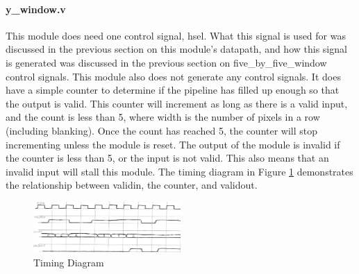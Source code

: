 \paragraph{y\_window.v}
This module does need one control signal, hsel. What this signal is used for was 
discussed in the previous section on this module's datapath, and how this 
signal is generated was discussed in the previous section on five\_by\_five\_window 
control signals. This module also does not generate any control signals. It does 
have a simple counter to determine if the pipeline has filled up enough so that 
the output is valid. This counter will increment as long as there is a valid 
input, and the count is less than 5, where width is the number of pixels in 
a row (including blanking). Once the count has reached 5, the counter will stop 
incrementing unless the module is reset. The output of the module is invalid if 
the counter is less than 5, or the input is not valid. This also means that an 
invalid input will stall this module. The timing diagram in Figure \ref{fig:timing_2} 
demonstrates the relationship between validin, the counter, and validout.


\begin{figure}
    \includegraphics[width=0.5\textwidth]{processed_image_pngs/timing_2.png}
    \caption{Timing Diagram}
    \label{fig:timing_2}
\end{figure}



